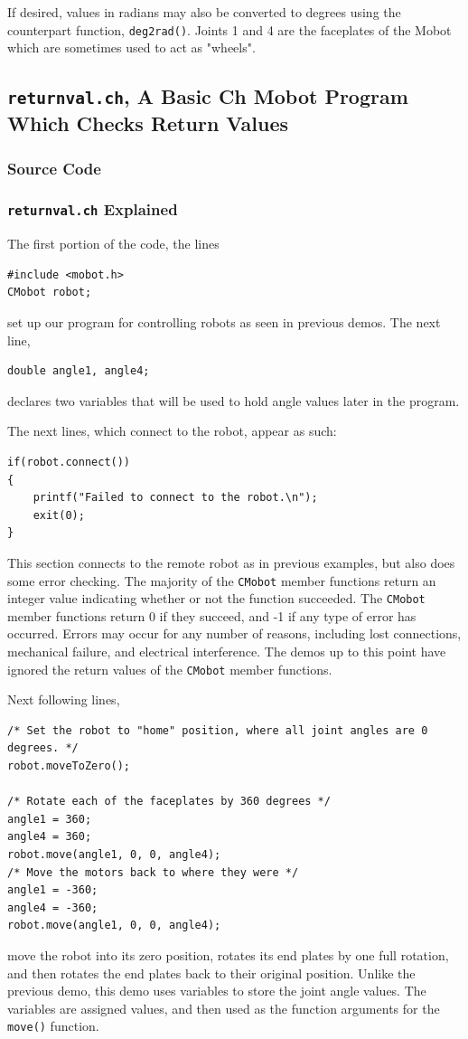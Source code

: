 \documentclass{article}
\begin{document}
If desired, values in radians
may also be converted to degrees using the counterpart function,
\texttt{deg2rad()}.
Joints 1 and 4 are the faceplates
of the Mobot which are sometimes used to act as "wheels".

\subsection{\texttt{returnval.ch}, A Basic Ch Mobot Program Which Checks Return Values}
\subsubsection{Source Code}


\subsubsection{\texttt{returnval.ch} Explained}
The first portion of the code, the lines
\begin{verbatim}
#include <mobot.h>
CMobot robot;
\end{verbatim}
set up our program for controlling robots as seen in previous demos. The next line,
\begin{verbatim}
double angle1, angle4;
\end{verbatim}
declares two variables that will be used to hold angle values later in the program.

The next
lines, which connect to the robot, appear as such:
\begin{verbatim}
if(robot.connect())
{
    printf("Failed to connect to the robot.\n");
    exit(0);
}
\end{verbatim}
This section connects to the remote robot as in previous examples, but also
does some error checking. The majority of the \texttt{CMobot} member functions
return an integer value indicating whether or not the function succeeded.
The \texttt{CMobot} member functions return 0 if they succeed, and -1
if any type of error has occurred. Errors may occur for any number of reasons,
including lost connections, mechanical failure, and electrical interference. 
The demos up to this point have ignored the return values of the 
\texttt{CMobot} member functions.

Next following lines,
\begin{verbatim}
/* Set the robot to "home" position, where all joint angles are 0 degrees. */
robot.moveToZero();

/* Rotate each of the faceplates by 360 degrees */
angle1 = 360;
angle4 = 360;
robot.move(angle1, 0, 0, angle4);
/* Move the motors back to where they were */
angle1 = -360;
angle4 = -360;
robot.move(angle1, 0, 0, angle4);
\end{verbatim}
move the robot into its zero position, rotates its end plates by one full rotation, and then
rotates the end plates back to their original position. Unlike the previous demo, this 
demo uses variables to store the joint angle values. The variables are assigned 
values, and then used as the function arguments for the \texttt{move()} function.
\end{document}
